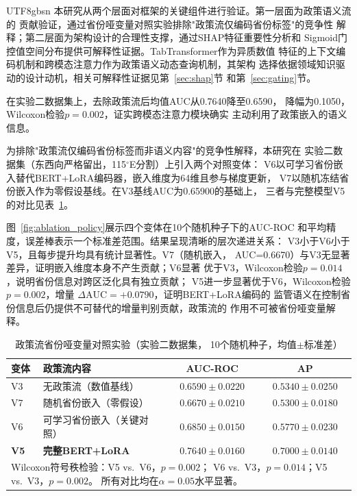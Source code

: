 \documentclass[12pt, a4paper]{article}
\begin{document}
\begin{CJK}{UTF8}{gbsn}
本研究从两个层面对框架的关键组件进行验证。第一层面为政策语义流的
贡献验证，通过省份哑变量对照实验排除"政策流仅编码省份标签"的竞争性
解释；第二层面为架构设计的合理性支撑，通过SHAP特征重要性分析和
Sigmoid门控值空间分布提供可解释性证据。TabTransformer作为异质数值
特征的上下文编码机制和跨模态注意力作为政策语义动态查询机制，其架构
选择依据领域知识驱动的设计动机，相关可解释性证据见第~\ref{sec:shap}节
和第~\ref{sec:gating}节。

在实验二数据集上，去除政策流后均值AUC从0.7640降至0.6590，
降幅为0.1050，Wilcoxon检验$p=0.002$，证实跨模态注意力模块确实
主动利用了政策嵌入的语义信息。

为排除"政策流仅编码省份标签而非语义内容"的竞争性解释，本研究在
实验二数据集（东西向严格留出，115$^\circ$E分割）上引入两个对照变体：
V6以可学习省份嵌入替代BERT+LoRA编码器，嵌入维度为64维且参与梯度更新，
V7以随机冻结省份嵌入作为零假设基线。在V3基线AUC为0.65900的基础上，
三者与完整模型V5的对比见表~\ref{tab:ablation_policy}。

图~\ref{fig:ablation_policy}展示四个变体在10个随机种子下的AUC-ROC
和平均精度，误差棒表示一个标准差范围。结果呈现清晰的层次递进关系：
V3小于V6小于V5，且每步提升均具有统计显著性。V7（随机嵌入，
AUC=0.6670）与V3无显著差异，证明嵌入维度本身不产生贡献；V6显著
优于V3，Wilcoxon检验$p=0.014$，说明省份信息对跨区泛化具有独立贡献；
V5进一步显著优于V6，Wilcoxon检验$p=0.002$，增量
$\Delta\text{AUC}=+0.0790$，证明BERT+LoRA编码的
监管语义在控制省份信息后仍提供不可替代的增量判别贡献，政策流的
作用不可被省份哑变量解释。

\begin{table}[H]
\centering
\caption{政策流省份哑变量对照实验（实验二数据集，
10个随机种子，均值$\pm$标准差）}
\label{tab:ablation_policy}
\small
\begin{tabular}{llcc}
\toprule
\textbf{变体} & \textbf{政策流内容} &
\textbf{AUC-ROC} & \textbf{AP} \\
\midrule
V3 & 无政策流（数值基线） &
  $0.6590\pm0.0220$ & $0.5340\pm0.0250$ \\
V7 & 随机省份嵌入（零假设） &
  $0.6670\pm0.0210$ & $0.5300\pm0.0180$ \\
V6 & 可学习省份嵌入（关键对照） &
  $0.6850\pm0.0150$ & $0.5770\pm0.0230$ \\
\textbf{V5} & \textbf{完整BERT+LoRA} &
  $\mathbf{0.7640\pm0.0160}$ & $\mathbf{0.7000\pm0.0140}$ \\
\bottomrule
\multicolumn{4}{p{0.85\textwidth}}{\small
  Wilcoxon符号秩检验：V5 vs.\ V6，$p=0.002$；
  V6 vs.\ V3，$p=0.014$；V5 vs.\ V3，$p=0.002$。
  所有对比均在$\alpha=0.05$水平显著。} \\
\end{tabular}
\end{table}


\end{CJK}
\end{document}
